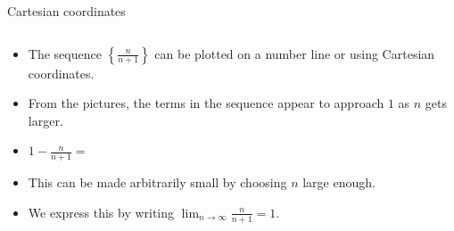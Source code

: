 \begin{frame}
\begin{columns}[c]
{}%
%
%
%
%

Cartesian coordinates
\end{columns}
\begin{itemize}
\item  The sequence $\left\{ \frac{n}{n+1}\right\}$ can be plotted on a number line or using Cartesian coordinates.
\item<12->  From the pictures, the terms in the sequence appear to approach $1$ as $n$ gets larger.
\item<13->  \alert<handout:0| 13-14>{$1 - \frac{n}{n+1} =$ }
\item<15->  This can be made arbitrarily small by choosing $n$ large enough.
\item<16->  We express this by writing $\lim_{n\to\infty}\frac{n}{n+1} = 1$.
\end{itemize}
\end{frame}
